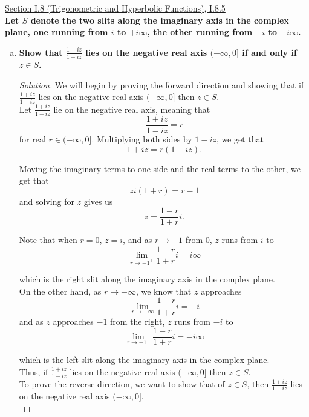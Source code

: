 \documentclass[11pt]{article}
\newenvironment{solution}
  {\renewcommand\qedsymbol{$\blacksquare$}\begin{proof}[Solution]}
  {\end{proof}}
\theoremstyle{definition}
\begin{document}
\newpage

\underline{Section I.8 (Trigonometric and Hyperbolic Functions), I.8.5} \\

\textbf{Let $S$ denote the two slits along the imaginary axis in the complex plane, one running from $i$ to $+i\infty$, the other running from $-i$ to $-i\infty$.}

\begin{enumerate}[a)]
\item \textbf{Show that $\frac{1+iz}{1-iz}$ lies on the negative real axis $(-\infty, 0]$ if and only if $z \in S$.}

\begin{solution}

We will begin by proving the forward direction and showing that if $\frac{1+iz}{1-iz}$ lies on the negative real axis $(-\infty, 0]$ then $z \in S$. \\

Let $\frac{1+iz}{1-iz}$ lie on the negative real axis, meaning that \[ \frac{1+iz}{1-iz} = r \] for real $r \in (-\infty, 0].$ Multiplying both sides by $1-iz$, we get that
\[ 1+iz = r(1-iz).\]

Moving the imaginary terms to one side and the real terms to the other, we get that \[zi(1+r) = r-1\] and solving for $z$ gives us
\[ z = \frac{1-r}{1+r}i. \]

Note that when $r=0$, $z=i$, and as $r \rightarrow -1$ from $0$, $z$ runs from $i$ to \[\lim\limits_{r \rightarrow -1^{+}} \frac{1-r}{1+r}i = i\infty\]

which is the right slit along the imaginary axis in the complex plane. \\

On the other hand, as $r \rightarrow -\infty$, we know that $z$ approaches \[ \lim\limits_{r \rightarrow -\infty} \frac{1-r}{1+r}i = -i\] and as $z$ approaches $-1$ from the right, $z$ runs from $-i$ to
\[ \lim\limits_{r \rightarrow -1^{-}} \frac{1-r}{1+r}i = -i\infty\]

which is the left slit along the imaginary axis in the complex plane. \\

Thus, if $\frac{1+iz}{1-iz}$ lies on the negative real axis $(-\infty, 0]$ then $z \in S$. \\


To prove the reverse direction, we want to show that of $z \in S$, then $\frac{1+iz}{1-iz}$ lies on the negative real axis $(-\infty, 0].$ \\


\end{solution}
\end{enumerate}
\end{document}
